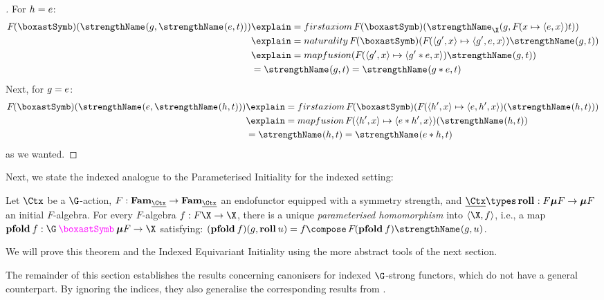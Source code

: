 \begin{proof}[]
  For $h = \unit$:
  \begin{align*}
    \fmap(\mapmul)
  (\gstrength(g,
   \gstrength(\unit, t)))
   &\explain={first axiom}
   \fmap (\mapmul)
  (\gstrength_{\X}(g,
   \fmap(\fun x \pair \unit x) t))
   \\&\explain={naturality}
   \fmap (\mapmul)
   (\fmap(\fun{\pair{g'}x}\triple{g'}\unit x)
     \gstrength(g, t))
   \\&\explain={map fusion}
   (\fmap(\fun{\pair{g'}x}\pair{g'\mul\unit}{x})
   \gstrength(g, t))
   \\&= \gstrength(g, t) = \gstrength(g\mul\unit, t)
  \end{align*}
  Next, for $g = \unit$:
  \begin{align*}
    \fmap(\mapmul)
  (\gstrength(\unit,
   \gstrength(h, t)))
   &\explain={first axiom}
   \fmap(\mapmul)(
   \fmap(\fun{\pair{h'}x}\triple\unit{h'}x)
   (\gstrength(h, t)))
   \\&\explain={map fusion}
   \fmap (\fun{\pair{h'}x}\pair{\unit\mul h'}x)
   (\gstrength(h, t))
   \\&= \gstrength(h, t) = \gstrength(\unit\mul h, t)
  \end{align*}
  as we wanted.
\end{proof}

Next, we state the indexed analogue to the Parameterised Initiality  for the indexed
setting:
\begin{theorem}%
  Let $\Ctx$ be a $\G$-action, $F : \Fam_{\carrier\Ctx} \to
  \Fam_{\carrier\Ctx}$ an endofunctor equipped with a symmetry
  strength, and $\carrier\Ctx \types \roll : F\fix F \to \fix F$ an
  initial $F$-algebra. For every $F$-algebra $f : F\X \to \X$,
  there is a unique \emph{parameterised homomorphism} into $\pair \X f$, i.e., a
  map
  $\pfold f : \gast \fix F \to \X$ satisfying:
  \(
  (\pfold f)(g, \roll u)
  =
  f\compose \fmap(\pfold f)\strength(g, u)
  \).
\end{theorem}

We will prove this theorem and the Indexed Equivariant Initiality
 using the more abstract tools of
the next section.

The remainder of this section establishes the results concerning
canonisers for indexed $\G$-strong functors, which do not have a
general counterpart. By ignoring the indices, they also generalise the
corresponding results from .

